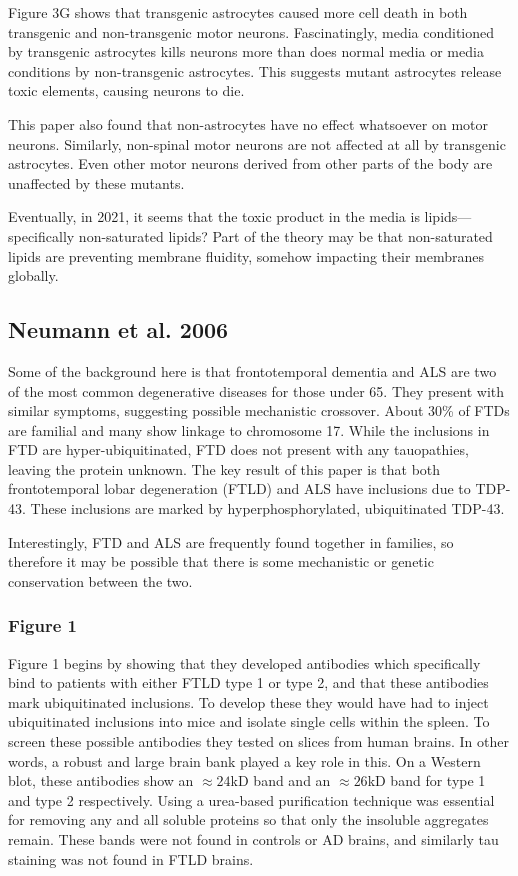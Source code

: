Figure 3G shows that transgenic astrocytes caused more cell death in both transgenic and non-transgenic motor neurons. Fascinatingly, media conditioned by transgenic astrocytes kills neurons more than does normal media or media conditions by non-transgenic astrocytes. This suggests mutant astrocytes release toxic elements, causing neurons to die.\newline

This paper also found that non-astrocytes have no effect whatsoever on motor neurons. Similarly, non-spinal motor neurons are not affected at all by transgenic astrocytes. Even other motor neurons derived from other parts of the body are unaffected by these mutants.\newline

Eventually, in 2021, it seems that the toxic product in the media is lipids---specifically non-saturated lipids? Part of the theory may be that non-saturated lipids are preventing membrane fluidity, somehow impacting their membranes globally. 


\subsection*{Neumann et al. 2006}

Some of the background here is that frontotemporal dementia and ALS are two of the most common degenerative diseases for those under 65. They present with similar symptoms, suggesting possible mechanistic crossover. About 30\% of FTDs are familial and many show linkage to chromosome 17. While the inclusions in FTD are hyper-ubiquitinated, FTD does not present with any tauopathies, leaving the protein unknown. The key result of this paper is that both frontotemporal lobar degeneration (FTLD) and ALS have inclusions due to TDP-43. These inclusions are marked by hyperphosphorylated, ubiquitinated TDP-43.\newline

Interestingly, FTD and ALS are frequently found together in families, so therefore it may be possible that there is some mechanistic or genetic conservation between the two. 

\subsubsection*{Figure 1}

Figure 1 begins by showing that they developed antibodies which specifically bind to patients with either FTLD type 1 or type 2, and that these antibodies mark ubiquitinated inclusions. To develop these they would have had to inject ubiquitinated inclusions into mice and isolate single cells within the spleen. To screen these possible antibodies they tested on slices from human brains. In other words, a robust and large brain bank played a key role in this. On a Western blot, these antibodies show an $\approx 24$kD band and an $\approx 26$kD band for type 1 and type 2 respectively. Using a urea-based purification technique was essential for removing any and all soluble proteins so that only the insoluble aggregates remain. These bands were not found in controls or AD brains, and similarly tau staining was not found in FTLD brains.\newline

